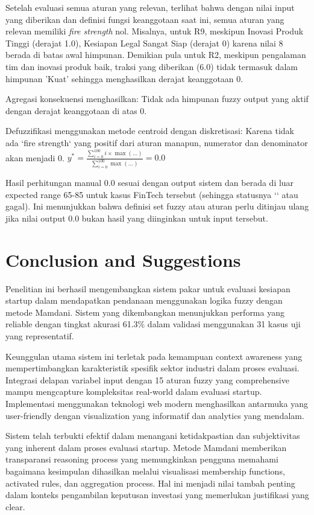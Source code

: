 \documentclass{article}
\begin{document}
Setelah evaluasi semua aturan yang relevan, terlihat bahwa dengan nilai input yang diberikan dan definisi fungsi keanggotaan saat ini, semua aturan yang relevan memiliki \textit{fire strength} nol.
Misalnya, untuk R9, meskipun Inovasi Produk Tinggi (derajat 1.0), Kesiapan Legal Sangat Siap (derajat 0) karena nilai 8 berada di batas awal himpunan. Demikian pula untuk R2, meskipun pengalaman tim dan inovasi produk baik, traksi yang diberikan (6.0) tidak termasuk dalam himpunan 'Kuat' sehingga menghasilkan derajat keanggotaan 0.

Agregasi konsekuensi menghasilkan:
Tidak ada himpunan fuzzy output yang aktif dengan derajat keanggotaan di atas 0.

Defuzzifikasi menggunakan metode centroid dengan diskretisasi:
Karena tidak ada `fire strength` yang positif dari aturan manapun, numerator dan denominator akan menjadi 0.
$y^* = \frac{\sum_{i=0}^{100} i \times \max(\dots)}{\sum_{i=0}^{100} \max(\dots)} = 0.0$

Hasil perhitungan manual 0.0 sesuai dengan output sistem dan berada di luar expected range 65-85 untuk kasus FinTech tersebut (sehingga statusnya `` atau gagal). Ini menunjukkan bahwa definisi set fuzzy atau aturan perlu ditinjau ulang jika nilai output 0.0 bukan hasil yang diinginkan untuk input tersebut.

\section{Conclusion and Suggestions}

Penelitian ini berhasil mengembangkan sistem pakar untuk evaluasi kesiapan startup dalam mendapatkan pendanaan menggunakan logika fuzzy dengan metode Mamdani. Sistem yang dikembangkan menunjukkan performa yang reliable dengan tingkat akurasi 61.3\% dalam validasi menggunakan 31 kasus uji yang representatif.

Keunggulan utama sistem ini terletak pada kemampuan context awareness yang mempertimbangkan karakteristik spesifik sektor industri dalam proses evaluasi. Integrasi delapan variabel input dengan 15 aturan fuzzy yang comprehensive mampu mengcapture kompleksitas real-world dalam evaluasi startup. Implementasi menggunakan teknologi web modern menghasilkan antarmuka yang user-friendly dengan visualization yang informatif dan analytics yang mendalam.

Sistem telah terbukti efektif dalam menangani ketidakpastian dan subjektivitas yang inherent dalam proses evaluasi startup. Metode Mamdani memberikan transparansi reasoning process yang memungkinkan pengguna memahami bagaimana kesimpulan dihasilkan melalui visualisasi membership functions, activated rules, dan aggregation process. Hal ini menjadi nilai tambah penting dalam konteks pengambilan keputusan investasi yang memerlukan justifikasi yang clear.
\end{document}
